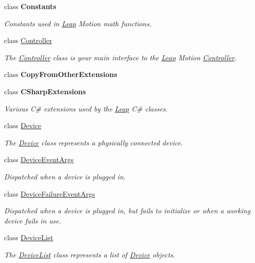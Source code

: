 \begin{DoxyCompactItemize}
class {\bfseries Constants}
\begin{DoxyCompactList}\small\item\em Constants used in \mbox{\hyperlink{namespace_leap}{Leap}} Motion math functions. \end{DoxyCompactList}\item 
class \mbox{\hyperlink{class_leap_1_1_controller}{Controller}}
\begin{DoxyCompactList}\small\item\em The \mbox{\hyperlink{class_leap_1_1_controller}{Controller}} class is your main interface to the \mbox{\hyperlink{namespace_leap}{Leap}} Motion \mbox{\hyperlink{class_leap_1_1_controller}{Controller}}. \end{DoxyCompactList}\item 
class {\bfseries Copy\+From\+Other\+Extensions}
\item 
class {\bfseries C\+Sharp\+Extensions}
\begin{DoxyCompactList}\small\item\em Various C\# extensions used by the \mbox{\hyperlink{namespace_leap}{Leap}} C\# classes. \end{DoxyCompactList}\item 
class \mbox{\hyperlink{class_leap_1_1_device}{Device}}
\begin{DoxyCompactList}\small\item\em The \mbox{\hyperlink{class_leap_1_1_device}{Device}} class represents a physically connected device. \end{DoxyCompactList}\item 
class \mbox{\hyperlink{class_leap_1_1_device_event_args}{Device\+Event\+Args}}
\begin{DoxyCompactList}\small\item\em Dispatched when a device is plugged in. \end{DoxyCompactList}\item 
class \mbox{\hyperlink{class_leap_1_1_device_failure_event_args}{Device\+Failure\+Event\+Args}}
\begin{DoxyCompactList}\small\item\em Dispatched when a device is plugged in, but fails to initialize or when a working device fails in use. \end{DoxyCompactList}\item 
class \mbox{\hyperlink{class_leap_1_1_device_list}{Device\+List}}
\begin{DoxyCompactList}\small\item\em The \mbox{\hyperlink{class_leap_1_1_device_list}{Device\+List}} class represents a list of \mbox{\hyperlink{class_leap_1_1_device}{Device}} objects. \end{DoxyCompactList}\item 

\end{DoxyCompactItemize}
